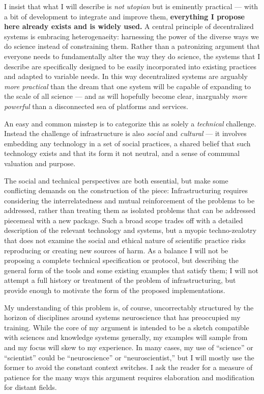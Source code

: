 \documentclass{article}
\begin{document}
I insist that what I will describe is \emph{not utopian} but is
eminently practical --- with a bit of development to integrate and
improve them, \textbf{everything I propose here already exists and is
widely used.} A central principle of decentralized systems is embracing
heterogenaeity: harnessing the power of the diverse ways we do science
instead of constraining them. Rather than a patronizing argument that
everyone needs to fundamentally alter the way they do science, the
systems that I describe are specifically designed to be easily
incorporated into existing practices and adapted to variable needs. In
this way decentralized systems are arguably \emph{more practical} than
the dream that one system will be capable of expanding to the scale of
all science --- and as will hopefully become clear, inarguably
\emph{more powerful} than a disconnected sea of platforms and services.

An easy and common misstep is to categorize this as solely a
\emph{technical} challenge. Instead the challenge of infrastructure is
also \emph{social} and \emph{cultural} --- it involves embedding any
technology in a set of social practices, a shared belief that such
technology exists and that its form it not neutral, and a sense of
communal valuation and purpose.

The social and technical perspectives are both essential, but make some
conflicting demands on the construction of the piece: Infrastructuring
requires considering the interrelatedness and mutual reinforcement of
the problems to be addressed, rather than treating them as isolated
problems that can be addressed piecemeal with a new package. Such a
broad scope trades off with a detailed description of the relevant
technology and systems, but a myopic techno-zealotry that does not
examine the social and ethical nature of scientific practice risks
reproducing or creating new sources of harm. As a balance I will not be
proposing a complete technical specification or protocol, but describing
the general form of the tools and some existing examples that satisfy
them; I will not attempt a full history or treatment of the problem of
infrastructuring, but provide enough to motivate the form of the
proposed implementations.

My understanding of this problem is, of course, uncorrectably structured
by the horizon of disciplines around systems neuroscience that has
preoccupied my training. While the core of my argument is intended to be
a sketch compatible with sciences and knowledge systems generally, my
examples will sample from and my focus will skew to my experience. In
many cases, my use of ``science'' or ``scientist'' could be
``neuroscience'' or ``neuroscientist,'' but I will mostly use the former
to avoid the constant context switches. I ask the reader for a measure
of patience for the many ways this argument requires elaboration and
modification for distant fields.
\end{document}
